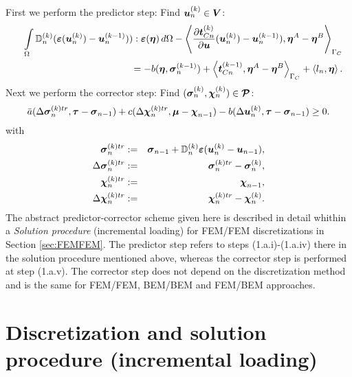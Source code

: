 \documentclass[12pt,a4paper]{scrbook}
\begin{document}
First we perform the predictor step:
Find $\mbox{\boldmath$u$}^{(k)}_{n} \in\mbox{\boldmath$V$}$:
\begin{eqnarray}
&&\int\limits_{\Omega}{\mathbb D}^{(k)}_{n}(\mbox{\boldmath$\varepsilon$}(\mbox{\boldmath$u$}^{(k)}_{n})-\mbox{\boldmath$u$}^{(k-1)}_{n})):\mbox{\boldmath$\varepsilon$}(\mbox{\boldmath$\eta$})\, d\Omega - \left\langle \frac{\partial\mbox{\boldmath$t$}^{(k)}_{Cn}}{\partial \mbox{\boldmath$u$}}(\mbox{\boldmath$u$}^{(k)}_{n})-\mbox{\boldmath$u$}^{(k-1)}_{n}), \mbox{\boldmath$\eta$}^{A}-\mbox{\boldmath$\eta$}^{B} \right\rangle_{\Gamma_C}   \nonumber \\ &&=-b(\mbox{\boldmath$\eta$},\mbox{\boldmath$\sigma$}^{(k-1)}_{n})+\left\langle \mbox{\boldmath$t$}^{(k-1)}_{Cn}, \mbox{\boldmath$\eta$}^{A}-\mbox{\boldmath$\eta$}^{B} \right\rangle_{\Gamma_C}+\left\langle l_{n},\mbox{\boldmath$\eta$}\right\rangle.
\end{eqnarray}
Next we perform the corrector step: 
Find $(\mbox{\boldmath$\sigma$}^{(k)}_{n},\mbox{\boldmath$\chi$}^{(k)}_{n})\in\mbox{\boldmath$\mathcal{P}$}$:
\begin{equation}
 \bar{a}(\Delta \mbox{\boldmath$\sigma$}^{(k)tr}_{ {n}},\mbox{\boldmath$\tau$}-\mbox{\boldmath$\sigma$}_{n-1})+c(\Delta \mbox{\boldmath$\chi$}^{(k)tr}_{n},\mbox{\boldmath$\mu$}-\mbox{\boldmath$\chi$}_{n-1})-b(\Delta \mbox{\boldmath$u$}^{(k)}_{n},\mbox{\boldmath$\tau$}-\mbox{\boldmath$\sigma$}_{n-1})\geq 0.
\end{equation}
with
\begin{eqnarray}
 \mbox{\boldmath$\sigma$}^{(k)tr}_{n}&:=&\mbox{\boldmath$\sigma$}_{n-1}+{\mathbb D}^{(k)}_{n}\mbox{\boldmath$\varepsilon$}(\mbox{\boldmath$u$}^{(k)}_{n}-\mbox{\boldmath$u$}_{n-1}), \\
 \Delta \mbox{\boldmath$\sigma$}^{(k)tr}_{n}&:=&\mbox{\boldmath$\sigma$}^{(k)tr}_{n}-\mbox{\boldmath$\sigma$}^{(k)}_{n}, \\
 \mbox{\boldmath$\chi$}^{(k)tr}_{n}&:=&\mbox{\boldmath$\chi$}_{n-1}, \\
 \Delta \mbox{\boldmath$\chi$}^{(k)tr}_{n}&:=&\mbox{\boldmath$\chi$}^{(k)tr}_{n}-\mbox{\boldmath$\chi$}^{(k)}_{n}.
\end{eqnarray}
The abstract predictor-corrector scheme given here is described in detail whithin a \textit{Solution procedure} (incremental loading)  for FEM/FEM discretizations in Section \ref{sec:FEMFEM}. The predictor step refers to steps (1.a.i)-(1.a.iv) there in the solution procedure mentioned above, whereas the corrector step is performed at step (1.a.v). The corrector step does not depend on the discretization method and is the same for FEM/FEM, BEM/BEM and FEM/BEM approaches.
\newpage
\section{Discretization and solution procedure (incremental loading)}\label{sec:ElPlContact:DiscretizationSolutionProcedure}
\end{document}
